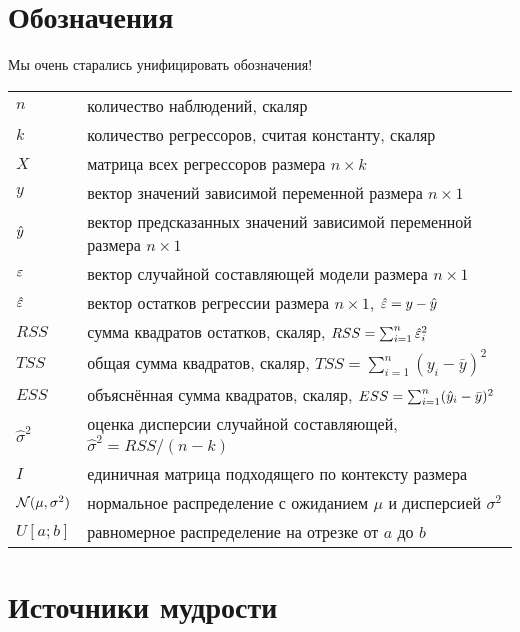\documentclass[11pt, openany]{book}
\theoremstyle{definition}
\begin{document}
\chapter{Обозначения}


Мы очень старались унифицировать обозначения!


\begin{tabular}{@{}ll@{}}
\toprule
$n$ & количество наблюдений, скаляр \\
$k$ & количество регрессоров, считая константу, скаляр \\
$X$ & матрица всех регрессоров размера $n\times k$  \\
$y$ & вектор значений зависимой переменной размера $n\times 1$  \\ 
$\hat{y}$ & вектор предсказанных значений зависимой переменной размера $n\times 1$ \\
$\varepsilon$ & вектор случайной составляющей модели размера $n\times 1$ \\
$\hat{\varepsilon}$ & вектор остатков регрессии размера $n\times 1$, $\hat{\varepsilon} = y - \hat{y}$ \\
$RSS$ & сумма квадратов остатков, скаляр, $RSS=\sum_{i=1}^n\hat{\varepsilon}_i^2$ \\
$TSS$ & общая сумма квадратов, скаляр, $TSS=\sum_{i=1}^n(y_i - \bar y)^2$ \\
$ESS$ & объяснённая сумма квадратов, скаляр, $ESS=\sum_{i=1}^n(\hat{y}_i - \bar y)^2$ \\
$\hat\sigma^2$ & оценка дисперсии случайной составляющей, $\hat\sigma^2 = RSS/(n-k)$ \\
$I$ & единичная матрица подходящего по контексту размера \\
$\mathcal{N}(\mu, \sigma^2)$ & нормальное распределение с ожиданием $\mu$ и дисперсией $\sigma^2$ \\
$U[a;b]$ & равномерное распределение на отрезке от $a$ до $b$ \\
\bottomrule
\end{tabular}


\chapter{Источники мудрости}
\printbibliography[heading=none]




\listoftodos %
\end{document}

